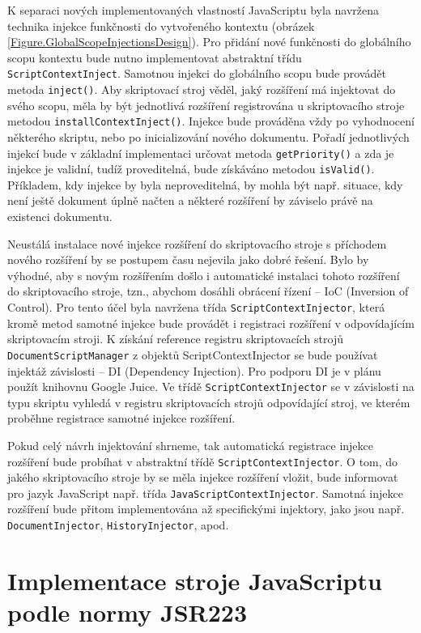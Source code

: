 K separaci nových implementovaných vlastností JavaScriptu byla navržena technika injekce funkčnosti do vytvořeného kontextu (obrázek \ref{Figure.GlobalScopeInjectionsDesign}). Pro přidání nové funkčnosti do globálního scopu kontextu bude nutno implementovat abstraktní třídu \texttt{ScriptContextInject}. Samotnou injekci do globálního scopu bude provádět metoda \texttt{inject()}. Aby skriptovací stroj věděl, jaký rozšíření má injektovat do svého scopu, měla by být jednotlivá rozšíření registrována u skriptovacího stroje metodou \texttt{installContextInject()}. Injekce bude prováděna vždy po vyhodnocení některého skriptu, nebo po inicializování nového dokumentu. Pořadí jednotlivých injekcí bude v základní implementaci určovat metoda \texttt{getPriority()} a zda je injekce je validní, tudíž proveditelná, bude získáváno metodou \texttt{isValid()}. Příkladem, kdy injekce by byla neproveditelná, by mohla být např. situace, kdy není ještě dokument úplně načten a některé rozšíření by záviselo právě na existenci dokumentu.

Neustálá instalace nové injekce rozšíření do skriptovacího stroje s příchodem nového rozšíření by se postupem času nejevila jako dobré řešení. Bylo by výhodné, aby s novým rozšířením došlo i automatické instalaci tohoto rozšíření do skriptovacího stroje, tzn., abychom dosáhli obrácení řízení -- IoC (Inversion of Control). Pro tento účel byla navržena třída \texttt{ScriptContextInjector}, která kromě metod samotné injekce bude provádět i registraci rozšíření v odpovídajícím skriptovacím stroji. K získání reference registru skriptovacích strojů \texttt{DocumentScriptManager} z objektů ScriptContextInjector se bude používat injektáž závislosti -- DI (Dependency Injection). Pro podporu DI je v plánu použít knihovnu Google Juice. Ve třídě \texttt{ScriptContextInjector} se v závislosti na typu skriptu vyhledá v registru skriptovacích strojů odpovídající stroj, ve kterém proběhne registrace samotné injekce rozšíření. 

Pokud celý návrh injektování shrneme, tak automatická registrace injekce rozšíření bude probíhat v abstraktní třídě \texttt{ScriptContextInjector}. O tom, do jakého skriptovacího stroje by se měla injekce rozšíření vložit, bude informovat pro jazyk JavaScript např. třída \texttt{JavaScriptContextInjector}. Samotná injekce rozšíření bude přitom implementována až specifickými injektory, jako jsou např. \texttt{DocumentInjector}, \texttt{HistoryInjector}, apod.

\section{Implementace stroje JavaScriptu podle normy JSR223}
\label{Chapter.Design.JavaScriptEngineJSR223}

